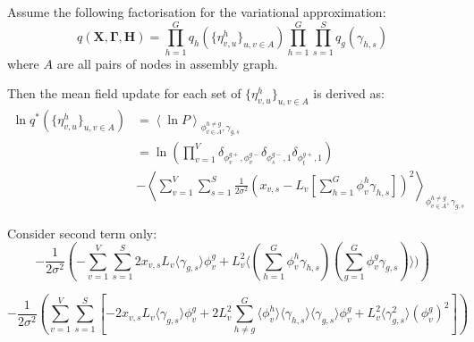 \documentclass[10pt]{article}
\begin{document}
Assume the following factorisation for the variational approximation:
\begin{equation}
q(\mathbf{X},\mathbf{\Gamma},\mathbf{H})  =  \prod_{h=1}^G q_h(\{ \eta^h_{v,u} \} _{u,v \in A}) \prod_{h=1}^G \prod_{s=1}^S q_g(\gamma_{h,s})
\end{equation}
where $A$ are all pairs of nodes in assembly graph.

Then the mean field update for each set of $ \{\eta^h_{v,u}\}_{u,v \in A}$ is derived as:
\begin{align}
\ln q^*( \{ \eta^h_{v,u} \} _{u,v \in A}) & =  \left\langle \ln P \right\rangle _{ \phi^{h \neq g}_{v \in A},\gamma_{g,s}} \\
& =  \ln \left( \prod_{v=1}^V \delta_{ \phi^{g+}_v, \phi^{g-}_v} \delta_{\phi^{g-}_s,1}  \delta_{\phi^{g+}_t,1} \right)\\
& -  \left\langle \sum_{v=1}^V \sum_{s=1}^S \frac{1}{2\sigma^2}\left( x_{v,s} - L_v[\sum_{h=1}^G \phi^h_v \gamma_{h,s}] \right)^2 \right\rangle _{ \phi^{h \neq g}_{v \in A},\gamma_{g,s}}
\end{align}

Consider second term only:
\begin{equation}
 - \frac{1}{2\sigma^2}\left ( 
- \sum_{v=1}^V \sum_{s=1}^S 2 x_{v,s} L_v \langle \gamma_{g,s} \rangle \phi^{g}_v
+ L_v^2 \langle (\sum_{h=1}^G \phi^h_v \gamma_{h,s}) (\sum_{g=1}^G \phi^g_v \gamma_{g,s}) \rangle)
\right )
\end{equation}

\begin{equation}
 - \frac{1}{2\sigma^2}\left ( 
 \sum_{v=1}^V \sum_{s=1}^S \left [ -2 x_{v,s} L_v \langle \gamma_{g,s} \rangle \phi^{g}_v
+ 2 L_v^ 2 \sum_{h \neq g }^G \langle \phi^h_v \rangle \langle \gamma_{h,s} \rangle \langle \gamma_{g,s} \rangle \phi^{g}_v
+ L_v^2 \langle \gamma_{g,s}^2 \rangle (\phi^{g}_v)^2
\right]
\right )
\end{equation}
\end{document}
